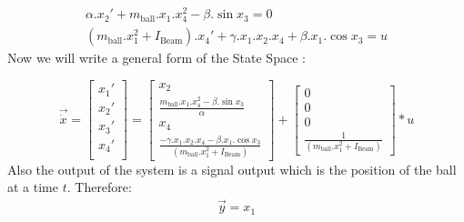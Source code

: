\documentclass{article}
\begin{document}
\begin{equation}
	\begin{split}
		\alpha.x_2' +  m_{\text{ball}}.x_1.x_4^2 - \beta.\sin{x_3} = 0 \\
		(m_{\text{ball}}.x_1^2 + I_{\text{Beam}}).x_4' + \gamma.x_1.x_2.x_4 + \beta.x_1.\cos{x_3} = u
	\end{split}
\end{equation}
Now we will write a general form of the State Space :

\begin{equation}
	\vec{\dot{x}} =
	\begin{bmatrix}
		x_1' \\
		x_2' \\
		x_3' \\
		x_4' \\
	\end{bmatrix} =
	\begin{bmatrix}
		x_2\\
		\frac{ m_{\text{ball}}.x_1.x_4^2 - \beta.\sin{x_3}}{\alpha} \\
		x_4\\
		\frac{- \gamma.x_1.x_2.x_4 - \beta.x_1.\cos{x_3}}{(m_{\text{ball}}.x_1^2 + I_{\text{Beam}})}
	\end{bmatrix}+
	\begin{bmatrix}
		0 \\
		0\\
		0\\
		\frac{1}{(m_{\text{ball}}.x_1^2 + I_{\text{Beam}})}
	\end{bmatrix}*u
\end{equation}
Also the output of the system is a signal output which is the position of the ball at a time $t$.
Therefore:
\begin{equation}
	\begin{split}
		\vec{y} = x_1
	\end{split}
\end{equation}
\newpage
\end{document}
